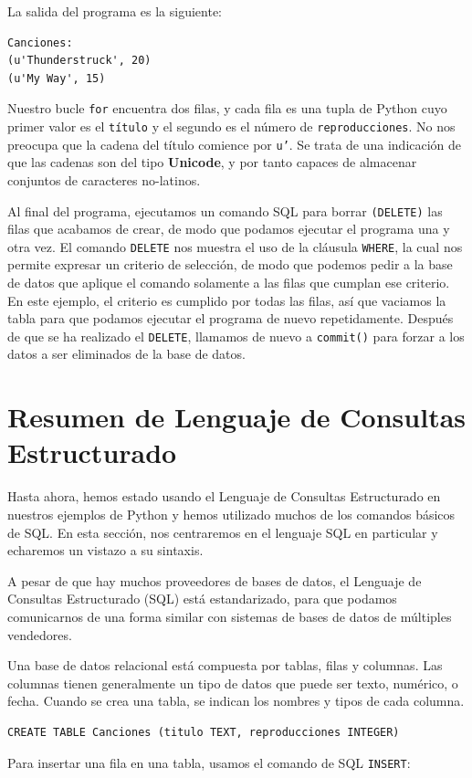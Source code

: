 La salida del programa es la siguiente:

\beforeverb
\begin{verbatim}
Canciones:
(u'Thunderstruck', 20)
(u'My Way', 15)
\end{verbatim}
\afterverb
%
Nuestro bucle {\tt for} encuentra dos filas, y cada fila es una tupla de Python cuyo
primer valor es el {\tt título} y el segundo es el número de {\tt reproducciones}.
No nos preocupa que la cadena del título comience por
{\tt u'}. Se trata de una indicación de que las cadenas son del tipo {\bf Unicode},
y por tanto capaces de almacenar conjuntos de caracteres no-latinos.

Al final del programa, ejecutamos un comando SQL para borrar {\tt (DELETE)}
las filas que acabamos de crear, de modo que podamos ejecutar el programa una y otra vez.
El comando {\tt DELETE} nos muestra el uso de la cláusula {\tt WHERE}, la cual
nos permite expresar un criterio de selección, de modo que podemos pedir a la base de datos
que aplique el comando solamente a las filas que cumplan ese criterio. En este ejemplo,
el criterio es cumplido por todas las filas, así que vaciamos la tabla
para que podamos ejecutar el programa de nuevo repetidamente. Después de que se ha realizado el
{\tt DELETE}, llamamos de nuevo a {\tt commit()} para forzar a los datos a ser eliminados de
la base de datos.

\section{Resumen de Lenguaje de Consultas Estructurado}

Hasta ahora, hemos estado usando el Lenguaje de Consultas Estructurado en nuestros
ejemplos de Python y hemos utilizado muchos de los comandos básicos de SQL.
En esta sección, nos centraremos en el lenguaje SQL en particular
y echaremos un vistazo a su sintaxis.

A pesar de que hay muchos proveedores de bases de datos, el Lenguaje de Consultas
Estructurado (SQL) está estandarizado, para que podamos comunicarnos de una forma
similar con sistemas de bases de datos de múltiples vendedores. 

Una base de datos relacional está compuesta por tablas, filas y columnas. Las columnas
tienen generalmente un tipo de datos que puede ser texto, numérico, o fecha. Cuando se crea
una tabla, se indican los nombres y tipos de cada columna.

\beforeverb
\begin{verbatim}
CREATE TABLE Canciones (titulo TEXT, reproducciones INTEGER)
\end{verbatim}
\afterverb
%
Para insertar una fila en una tabla, usamos el comando de SQL {\tt INSERT}:

